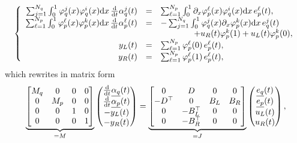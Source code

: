 \documentclass[letterpaper,10pt,english]{sphinxmanual}
\begin{document}
\begin{equation*}
\begin{split}\left\lbrace
\begin{array}{rcl}
\sum_{j=1}^{N_q} \int_0^1 \varphi_q^j(x) \varphi_q^i(x) {\rm d}x \, \frac{\rm d}{{\rm d}t} \alpha_q^j(t) &=& \sum_{\ell=1}^{N_p} \int_0^1 \partial_x \varphi_p^\ell(x) \varphi_q^i(x) {\rm d}x \, e_p^\ell(t), \\
\sum_{\ell=1}^{N_p} \int_0^1 \varphi_p^\ell(x) \varphi_p^k(x) {\rm d}x \, \frac{\rm d}{{\rm d}t} \alpha_p^\ell(t) &=& - \sum_{j=1}^{N_q} \int_0^1 \varphi_q^j(x) \partial_x \varphi_p^k(x) {\rm d}x \, e_q^j(t) \\
&& \qquad \qquad + u_R(t) \varphi_p^k(1) + u_L(t) \varphi_p^k(0), \\
y_L(t) &=& \sum_{\ell=1}^{N_p} \varphi_p^\ell(0) \, e_p^\ell(t), \\
y_R(t) &=& \sum_{\ell=1}^{N_p} \varphi_p^\ell(1) \, e_p^\ell(t),
\end{array}
\right.\end{split}
\end{equation*}
\sphinxAtStartPar
which rewrites in matrix form
\begin{equation*}
\begin{split}\underbrace{\begin{bmatrix}
M_q & 0 & 0 & 0 \\
0 & M_p & 0 & 0 \\
0 & 0 & 1 & 0 \\
0 & 0 & 0 & 1
\end{bmatrix}}_{= M}
\begin{pmatrix}
\frac{\rm d}{{\rm d}t} \underline{\alpha_q}(t) \\
\frac{\rm d}{{\rm d}t} \underline{\alpha_p}(t) \\
- y_L(t) \\
- y_R(t)
\end{pmatrix}
=
\underbrace{\begin{bmatrix}
0 & D & 0 & 0 \\
-D^\top & 0 & B_L & B_R \\
0 & -B_L^\top & 0 & 0 \\
0 & -B_R^\top & 0 & 0
\end{bmatrix}}_{= J}
\begin{pmatrix}
\underline{e_q}(t) \\
\underline{e_p}(t) \\
u_L(t) \\
u_R(t)
\end{pmatrix},\end{split}
\end{equation*}
\end{document}
